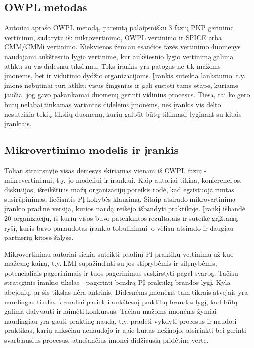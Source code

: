 \documentclass{VUMIFPSkursinis}
\begin{document}
\subsection{OWPL metodas}
Autoriai aprašo OWPL metodą, paremtą palaipsnišku 3 fazių PKP gerinimo vertinimu, sudarytu iš: mikrovertinimo, OWPL vertinimo ir SPICE arba CMM/CMMi vertinimo. Kiekvienos žemiau esančios fazės vertinimo duomenys naudojami aukštesnio lygio vertinime, kur aukštesnio lygio vertinimą galima atlikti su vis didesniu tikslumu. Toks įrankis yra patogus ne tik mažoms įmonėms, bet ir vidutinio dydžio organizacijoms. Įrankis suteikia lankstumo, t.y. įmonė nebūtinai turi atlikti visus žingsnius ir gali sustoti tame etape, kuriame jaučia, jog gavo pakankamai duomenų gerinti vidinius procesus. Tiesa, tai ko gero būtų nelabai tinkamas variantas didelėms įmonėms, nes įrankis vis dėlto nesuteikia tokių tikslių duomenų, kurių galbūt būtų tikimasi, lyginant su kitais įrankiais.

\subsection{Mikrovertinimo modelis ir įrankis}
Toliau straipsnyje visas dėmesys skiriamas vienam iš OWPL fazių - mikrovertinimui, t.y. jo modeliui ir įrankiui. Kaip autoriai tikina, konferencijos, diskusijos, išreikštinis mažų organizacijų poreikis rodė, kad egzistuoja rimtas susirūpinimas, liečiantis PĮ kokybės klausimą. Šitaip atsirado mikrovertinimo įrankio pradinė versija, kurios naudą reikėjo išbandyti praktikoje. Įrankį išbandė 20 organizacijų, iš kurių visos buvo patenkintos rezultatais ir suteikė grįžtamą ryšį, kuris buvo panaudotas įrankio tobulinimui, o vėliau atsirado ir daugiau partnerių kitose šalyse.

Mikrovertinimu autoriai siekia suteikti pradinį PĮ praktikų vertinimą už kuo mažesnę kainą, t.y. LMĮ supažindinti su jos stiprybėmis ir silpnybėmis, potencialiais pagerinimais ir tuos pagerinimus suskirstyti pagal svarbą. Tačiau strateginis įrankio tikslas - pagerinti bendrą PĮ praktikų brandos lygį. Kyla abejonių, ar šis tikslas nėra antrinis. Didesnėms įmonėms tam tikrais atvejais yra naudingas tikslas formaliai pasiekti aukštesnį praktikų brandos lygį, kad būtų galima dalyvauti ir laimėti konkursus. Tačiau mažoms įmonėms žymiai naudingiau yra gauti praktinę naudą, t.y. pradėti vykdyti procesus ir naudoti praktikas, kurių anksčiau nenaudojo ir apie kurias nežinojo, atsirinkti bei gerinti svarbiausius procesus, atnešančius įmonei didžiausią pridėtinę vertę.
\end{document}
